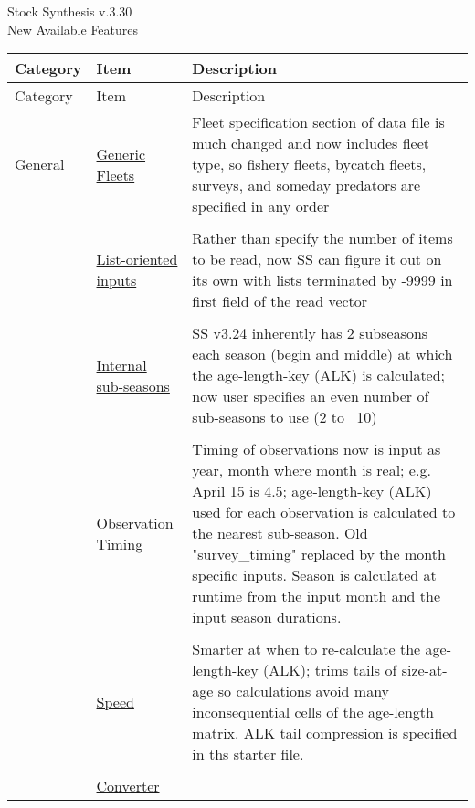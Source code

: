 \documentclass[12pt]{article}
\begin{document}
\begin{center}
	\Large{Stock Synthesis v.3.30\\
	New Available Features\\}
\end{center}

\begin{center}
	\begin{longtable}{p{2cm} p{3cm} p{10cm}}
	Category & Item & Description\\
	\hline
	\endfirsthead
	
	Category & Item & Description\\
	\hline
	\endhead
	
	\hline
	\endfoot
	
	\endlastfoot
	
		General & 
		\hyperlink{GenericFleets}{Generic Fleets} & 
		Fleet specification section of data file is much changed and now includes fleet type, so fishery fleets, bycatch fleets, surveys, and someday predators are specified in any order\\
		\\
		& \hyperlink{ListBased}{List-oriented inputs} & 
		Rather than specify the number of items to be read, now SS can figure it out on its own with lists terminated by -9999 in first field of the read vector \\
		\\					  
		& \hyperlink{SubSeas}{Internal sub-seasons} & 
		SS v3.24 inherently has 2 subseasons each season (begin and middle) at which the age-length-key (ALK) is calculated; now user specifies an even number of sub-seasons to use (2 to ~10) \\
		\\
		& \hyperlink{ObsTiming}{Observation Timing} & 
		Timing of observations now is input as year, month where month is real; e.g. April 15 is 4.5; age-length-key (ALK) used for each observation is calculated to the nearest sub-season.  Old "survey\_timing" replaced by the month specific inputs.  Season is calculated at runtime from the input month and the input season durations. \\
		\\
		& \hyperlink{ALK}{Speed} & 
		Smarter at when to re-calculate the age-length-key (ALK); trims tails of size-at-age so calculations avoid many inconsequential cells of the age-length matrix. ALK tail compression is specified in ths starter file.\\
		\\				
		& \hyperlink{Convert} {Converter} & 

\end{longtable}
\end{center}
\end{document}
